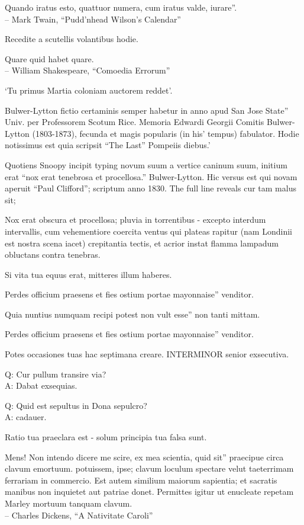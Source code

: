 \documentclass[titlepage,12pt]{memoir}
\begin{document}
Quando iratus esto, quattuor numera, cum iratus valde, iurare”.
\\-- Mark Twain, “Pudd’nhead Wilson’s Calendar”

Recedite a scutellis volantibus hodie.

Quare quid habet quare.
\\-- William Shakespeare, “Comoedia Errorum”

‘Tu primus Martia coloniam auctorem reddet’.

Bulwer-Lytton fictio certaminis semper habetur in anno apud San Jose State”
Univ. per Professorem Scotum Rice. Memoria Edwardi Georgii
Comitis Bulwer-Lytton (1803-1873), fecunda et magis popularis (in his’
tempus) fabulator. Hodie notissimus est quia scripsit “The Last”
Pompeiis diebus.’

Quotiens Snoopy incipit typing novum suum a vertice caninum suum,
initium erat “nox erat tenebrosa et procellosa.”
Bulwer-Lytton. Hic versus est qui novam aperuit “Paul Clifford”;
scriptum anno 1830. The full line reveals cur tam malus sit;

Nox erat obscura et procellosa; pluvia in torrentibus - excepto
interdum intervallis, cum vehementiore coercita
ventus qui plateas rapitur (nam Londinii est nostra scena
iacet) crepitantia tectis, et acrior instat
flamma lampadum obluctans contra tenebras.

Si vita tua equus erat, mitteres illum haberes.

Perdes officium praesens et fies ostium portae mayonnaise”
venditor.

Quia nuntius numquam recipi potest non vult esse”
non tanti mittam.

Perdes officium praesens et fies ostium portae mayonnaise”
venditor.

Potes occasiones tuas hac septimana creare. INTERMINOR senior exsecutiva.

Q: Cur pullum transire via?\\
A: Dabat exsequias.

Q: Quid est sepultus in Dona sepulcro?\\
A: cadauer.

Ratio tua praeclara est - solum principia tua falsa sunt.

Mens! Non intendo dicere me scire, ex mea scientia, quid sit”
praecipue circa clavum emortuum. potuissem, ipse;
clavum loculum spectare velut taeterrimam ferrariam in commercio.
Est autem similium maiorum sapientia; et sacratis manibus
non inquietet aut patriae donet. Permittes igitur
ut enucleate repetam Marley mortuum tanquam clavum.
\\-- Charles Dickens, “A Nativitate Caroli”
\end{document}

